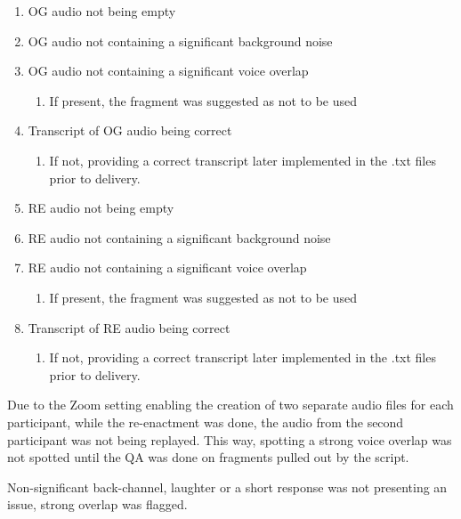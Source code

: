 \begin{enumerate}
    \item OG audio not being empty 
    \item OG audio not containing a significant background noise
    \item OG audio not containing a significant voice overlap
    \begin{enumerate}%
        \item If present, the fragment was suggested as not to be used 
    \end{enumerate} 
    \item Transcript of OG audio being correct 
    \begin{enumerate}%
        \item If not, providing a correct transcript later implemented in the .txt files prior to delivery.
    \end{enumerate} 
    \item RE audio not being empty 
    \item RE audio not containing a significant background noise 
    \item RE audio not containing a significant voice overlap 
    \begin{enumerate}%
        \item If present, the fragment was suggested as not to be used 
    \end{enumerate}
    \item Transcript of RE audio being correct 
    \begin{enumerate}%
        \item If not, providing a correct transcript later implemented in the .txt files prior to delivery.
    \end{enumerate}
\end{enumerate}

Due to the Zoom setting enabling the creation of two separate audio files for each participant, while the re-enactment was done, the audio from the second participant was not being replayed. This way, spotting a strong voice overlap was not spotted until the QA was done on fragments pulled out by the script. 

Non-significant back-channel, laughter or a short response was not presenting an issue, strong overlap was flagged. 



